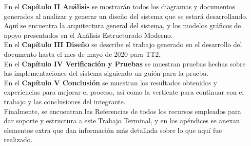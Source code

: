 En el \textbf{Capítulo II Análisis} se mostrarán todos los diagramas y documentos generados al analizar y generar un diseño del sistema que se estará desarrollando. Aquí se encuentra la arquitectura general del sistema, y los modelos gráficos de apoyo presentados en el Análisis Estructurado Moderno.\\

En el \textbf{Capítulo III Diseño} se describe el trabajo generado en el desarrollo del documento hasta el mes de mayo de 2020 para TT2.\\

En el \textbf{Capítulo IV Verificación y Pruebas} se muestran pruebas hechas sobre las implementaciones del sistema siguiendo un guión para la prueba.\\
 
En el \textbf{Capítulo V Conclusión} se muestran los resultados obtenidos y experiencias para mejorar el proceso, así como la vertiente para continuar con el trabajo y las conclusiones del integrante.\\

Finalmente, se encuentran las Referencias de todos los recursos empleados para dar soporte y estructura a este Trabajo Terminal, y en los apéndices se anexan elementos extra que dan información más detallada sobre lo que aquí fue realizado.\\
